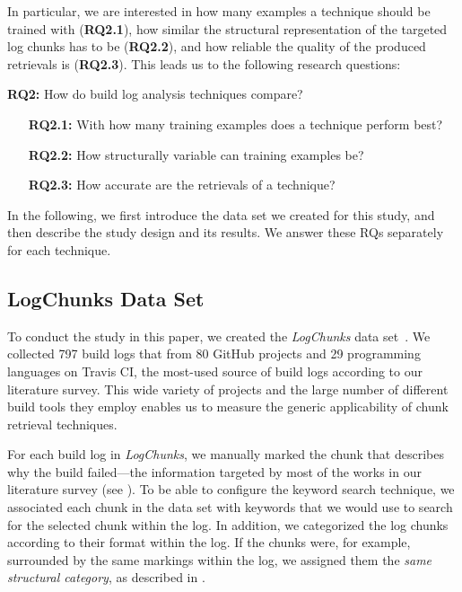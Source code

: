 \documentclass[10pt,journal,compsoc]{IEEEtran}
\begin{document}
In particular, we are interested in how many examples a technique
should be trained with (\textbf{RQ2.1}),
how similar the structural representation of the targeted log chunks
has to be (\textbf{RQ2.2}), and how reliable the quality of the
produced retrievals is (\textbf{RQ2.3}).
This leads us to the following research questions:

\begin{simplebox}[minipage boxed title*=-1.5cm,
attach boxed title to top center={yshift=-6mm}]
{\textbf{RQ2:} How do build log analysis techniques compare?}
\begin{itemize}[leftmargin=1.2cm]
  \item[\textbf{RQ2.1:}] With how many training examples does a
	technique perform best?
  \item[\textbf{RQ2.2:}] How structurally variable can training
  examples be?
  \item[\textbf{RQ2.3:}] How accurate are the retrievals of a technique?
\end{itemize}
\end{simplebox}

In the following, we first introduce the data set we created for this
study, and then describe the study design and its
results.
We answer these RQs separately for each technique.

\subsection{LogChunks Data Set}
\label{sec:logchunks}
To conduct the study in this paper, we created the
\emph{LogChunks} data set~\cite{brandt2020logchunks}.
We collected 797 build logs that
from 80 GitHub projects and 29
programming languages on Travis CI, the most-used source of build logs
according to our literature survey.
This wide variety of projects and the large number of different build
tools they employ enables us to measure the generic
applicability of chunk retrieval techniques.

For each build log in \emph{LogChunks}, we manually marked
the chunk that describes why the build
failed---the information targeted by most of the works in our
literature survey (see ).
To be able to configure the keyword search technique,
we associated each chunk in the data set with keywords that we
would use to search for the selected chunk within the log.
In
addition, we categorized the log chunks according to their format
within the log.
If the chunks were, for example, surrounded by the same markings
within the log, we assigned them the \emph{same structural category},
as described in .
\end{document}
